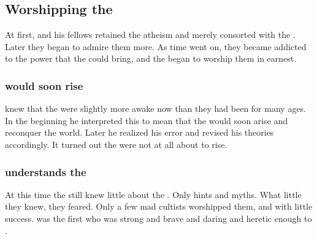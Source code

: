 \subsection{Worshipping the \xzaishanns}
At first, \Sethicus and his fellows retained the \ophidians atheism and merely consorted with the \xss. 
Later they began to admire them more. 
As time went on, they became addicted to the power that the \xss could bring, and the began to worship them in earnest. 






\subsubsection{\XzaiShanns would soon rise}
\Sethicus knew that the \xss were slightly more awake now than they had been for many ages.
In the beginning he interpreted this to mean that the \xss would soon arise and reconquer the world. 
Later he realized his error and revised his theories accordingly. 
It turned out the \xss were not at all about to rise. 





\subsubsection{\Sethicus understands the \xss}
At this time the \ophidians still knew little about the \xss. 
Only hints and myths.
What little they knew, they feared.
Only a few mad cultists worshipped them, and with little success.
\Sethicus was the first who was strong and brave and daring and heretic enough to . 


